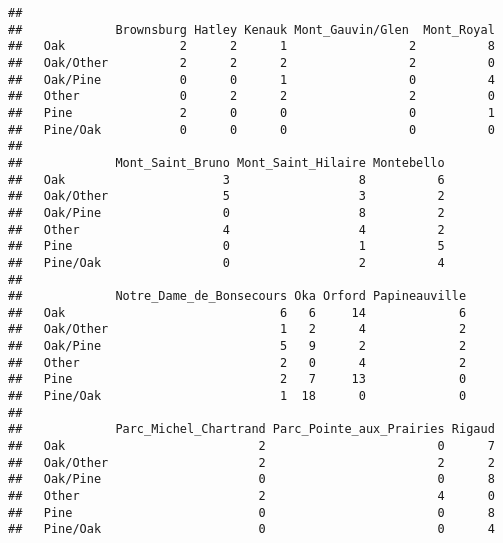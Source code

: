 \documentclass[
]{article}
\newenvironment{Shaded}{\begin{snugshade}}{\end{snugshade}}
\newcommand{\AttributeTok}[1]{\textcolor[rgb]{0.13,0.29,0.53}{#1}}
\newcommand{\CommentTok}[1]{\textcolor[rgb]{0.56,0.35,0.01}{\textit{#1}}}
\newcommand{\FunctionTok}[1]{\textcolor[rgb]{0.13,0.29,0.53}{\textbf{#1}}}
\newcommand{\NormalTok}[1]{#1}
\newcommand{\OtherTok}[1]{\textcolor[rgb]{0.56,0.35,0.01}{#1}}
\newcommand{\SpecialCharTok}[1]{\textcolor[rgb]{0.81,0.36,0.00}{\textbf{#1}}}
\newcommand{\StringTok}[1]{\textcolor[rgb]{0.31,0.60,0.02}{#1}}
\begin{document}
\begin{verbatim}
##            
##             Brownsburg Hatley Kenauk Mont_Gauvin/Glen  Mont_Royal
##   Oak                2      2      1                 2          8
##   Oak/Other          2      2      2                 2          0
##   Oak/Pine           0      0      1                 0          4
##   Other              0      2      2                 2          0
##   Pine               2      0      0                 0          1
##   Pine/Oak           0      0      0                 0          0
##            
##             Mont_Saint_Bruno Mont_Saint_Hilaire Montebello
##   Oak                      3                  8          6
##   Oak/Other                5                  3          2
##   Oak/Pine                 0                  8          2
##   Other                    4                  4          2
##   Pine                     0                  1          5
##   Pine/Oak                 0                  2          4
##            
##             Notre_Dame_de_Bonsecours Oka Orford Papineauville
##   Oak                              6   6     14             6
##   Oak/Other                        1   2      4             2
##   Oak/Pine                         5   9      2             2
##   Other                            2   0      4             2
##   Pine                             2   7     13             0
##   Pine/Oak                         1  18      0             0
##            
##             Parc_Michel_Chartrand Parc_Pointe_aux_Prairies Rigaud
##   Oak                           2                        0      7
##   Oak/Other                     2                        2      2
##   Oak/Pine                      0                        0      8
##   Other                         2                        4      0
##   Pine                          0                        0      8
##   Pine/Oak                      0                        0      4
\end{verbatim}

\begin{Shaded}
\end{Shaded}
\end{document}
